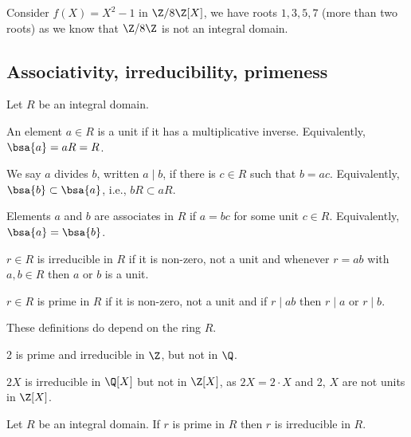 \begin{example}
Consider $f(X) = X^2 -1$ in $\Z/8\Z[X]$, we have roots $1,3,5,7$ (more than two roots) as we know that $\Z/8\Z$ is not an integral domain. %
\end{example}



\subsection{Associativity, irreducibility, primeness}


\begin{definition}\label{def:associativity_irreducibility_primeness_integral_domain}
Let $R$ be an integral domain.

An element $a \in R$ is a unit if it has a multiplicative inverse. Equivalently, $\bsa{a} = aR = R$.

We say $a$ divides $b$, written $a \mid b$, if there is $c \in R$ such that $b = ac$. Equivalently, $\bsa{b} \subset \bsa{a}$, i.e., $bR \subset aR$.

Elements $a$ and $b$ are associates in $R$ if $a = bc$ for some unit $c \in R$. Equivalently, $\bsa{a}= \bsa{b}$.

$r \in R$ is irreducible in $R$ if it is non-zero, not a unit and whenever $r = ab$ with $a, b \in R$ then $a$ or $b$ is a unit.

$r \in R$ is prime in $R$ if it is non-zero, not a unit and if $r \mid ab$ then $r \mid a$ or $r \mid b$.
\end{definition}

\begin{remark}
These definitions do depend on the ring $R$.

2 is prime and irreducible in $\Z$, but not in $\Q$.

$2X$ is irreducible in $\Q[X]$ but not in $\Z[X]$, as $2X = 2 \cdot X$ and 2, $X$ are not units in $\Z[X]$.
\end{remark}



\begin{lemma}\label{lem:prime_implies_irreducible_integral_domain}
Let $R$ be an integral domain. If $r$ is prime in $R$ then $r$ is irreducible in $R$.
\end{lemma}

